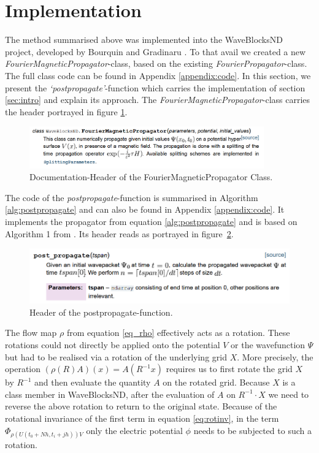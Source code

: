 \documentclass{article}
\begin{document}
\section{Implementation}
The method summarised above was implemented into the WaveBlocksND project, developed by Bourquin and Gradinaru \cite{waveblocksnd}. To that avail we created a new \emph{FourierMagneticPropagator}-class, based on the existing \emph{FourierPropagator}-class. The full class code can be found in Appendix \ref{appendix:code}. In this section, we present the \emph{`postpropagate'}-function which carries the implementation of section \ref{sec:intro} and explain its approach. \newline
The \emph{FourierMagneticPropagator}-class carries the header portrayed in figure \ref{fig:doc_fmp}.
\begin{figure}[h]
  \centering
  \includegraphics[width = 0.9\textwidth]{graphics/doc_fmp.PNG}
  \caption{Documentation-Header of the FourierMagneticPropagator Class.}
  \label{fig:doc_fmp}
\end{figure}
The code of the \emph{postpropagate}-function is summarised in Algorithm \ref{alg:postpropagate} and can also be found in Appendix \ref{appendix:code}. It implements the propagator from equation \ref{alg:postpropagate} and is based on Algorithm 1 from \cite{paper_orvg}. Its header reads as portrayed in figure~\ref{fig:pp}.
\begin{figure}
  \centering
  \includegraphics[width = 0.9 \textwidth]{graphics/doc_postpropagate.PNG}
  \caption{Header of the postpropagate-function.}
  \label{fig:pp}
\end{figure}

The flow map $\rho$ from equation \ref{eq_rho} effectively acts as a rotation. These rotations could not directly be applied onto the potential $V$ or the wavefunction $\Psi$ but had to be realised via a rotation of the underlying grid $X$. More precisely, the operation $(\rho(R)A)(x) = A(R^{-1}x)$ requires us to first rotate the grid $X$ by $R^{-1}$ and then evaluate the quantity $A$ on the rotated grid. Because $X$ is a class member in WaveBlocksND, after the evaluation of $A$ on $R^{-1}\cdot X$ we need to reverse the above rotation to return to the original state. \newline
Because of the rotational invariance of the first term in equation \ref{eq:rotinv}, in the term $\Phi_{\rho(U(t_0 + Nh, t_i + jh))V}$ only the electric potential $\phi$ needs to be subjected to such a rotation.
\end{document}
